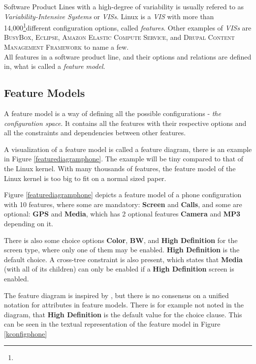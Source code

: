 \documentclass[a4paper,11pt]{report}
\newcommand{\f}{\footnote{\fn}}
\begin{document}
Software Product Lines with a high-degree of variability is usually refered to as 
\emph{Variability-Intensive Systems} or \emph{VISs}. Linux is a \emph{VIS} with 
more than 14,000\f different configuration options, called \emph{features}.
Other examples of \emph{VISs} are \textsc{BusyBox}, \textsc{Eclipse}, 
\textsc{Amazon Elastic Compute Service}, and \textsc{Drupal Content Management 
Framework}\cite[p. 1]{VarTesDrupal} to name a few.
\\

All features in a software product line, and their options and relations are 
defined in, what is called a \emph{feature model}.

            \subsection{Feature Models}

A feature model is a way of defining all the possible configurations - 
\emph{the configuration space}. It contains all the features with their 
respective options and all the constraints and dependencies between other features.

A visualization of a feature model is called a feature diagram, there is an 
example in Figure \ref{featurediagramphone}. The example will be tiny compared 
to that of the Linux kernel. With many thousands of features, the feature model 
of the Linux kernel is too big to fit on a normal sized paper.

Figure \ref{featurediagramphone} depicts a feature model of a phone 
configuration with 10 features, where some are mandatory: \textbf{Screen} and 
\textbf{Calls}, and some are optional: \textbf{GPS} and \textbf{Media}, which has 2
optional features \textbf{Camera} and \textbf{MP3} depending on it.

There is also some choice options \textbf{Color}, \textbf{BW}, and \textbf{High 
Definition} for the screen type, where only one of them may be enabled. 
\textbf{High Definition} is the default choice. A 
cross-tree constraint is also present, which states that \textbf{Media} (with 
all of its children) can only be enabled if a \textbf{High Definition} screen is 
enabled.

The feature diagram is inspired by \cite{AAFM}, but there is no consensus on a 
unified notation for attributes in feature models\cite{AAFM}. There is 
for example not noted in the diagram, that \textbf{High Definition} is the 
default value for the choice clause. This can be seen in the textual representation of the feature model in Figure \ref{kconfigphone}
\end{document}
